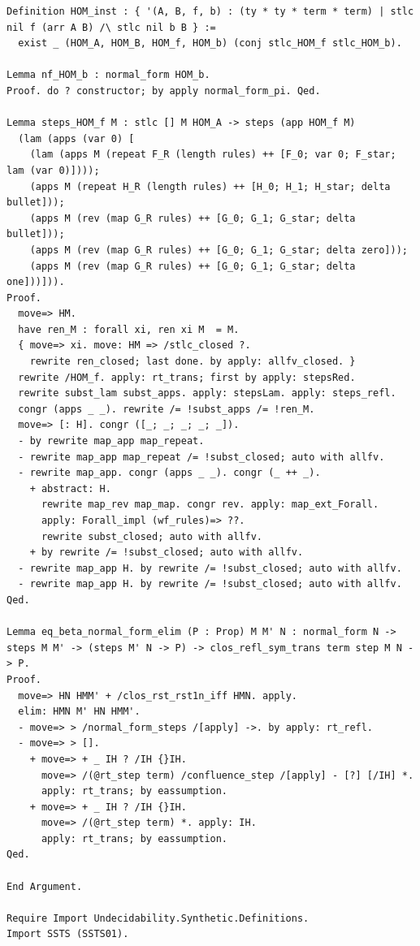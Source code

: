 \documentclass[10pt,a4paper]{amsart}
\begin{document}
\begin{lstlisting}
Definition HOM_inst : { '(A, B, f, b) : (ty * ty * term * term) | stlc nil f (arr A B) /\ stlc nil b B } :=
  exist _ (HOM_A, HOM_B, HOM_f, HOM_b) (conj stlc_HOM_f stlc_HOM_b).

Lemma nf_HOM_b : normal_form HOM_b.
Proof. do ? constructor; by apply normal_form_pi. Qed.

Lemma steps_HOM_f M : stlc [] M HOM_A -> steps (app HOM_f M) 
  (lam (apps (var 0) [
    (lam (apps M (repeat F_R (length rules) ++ [F_0; var 0; F_star; lam (var 0)])));
    (apps M (repeat H_R (length rules) ++ [H_0; H_1; H_star; delta bullet]));
    (apps M (rev (map G_R rules) ++ [G_0; G_1; G_star; delta bullet]));
    (apps M (rev (map G_R rules) ++ [G_0; G_1; G_star; delta zero]));
    (apps M (rev (map G_R rules) ++ [G_0; G_1; G_star; delta one]))])).
Proof.
  move=> HM.
  have ren_M : forall xi, ren xi M  = M.
  { move=> xi. move: HM => /stlc_closed ?.
    rewrite ren_closed; last done. by apply: allfv_closed. }
  rewrite /HOM_f. apply: rt_trans; first by apply: stepsRed.
  rewrite subst_lam subst_apps. apply: stepsLam. apply: steps_refl.
  congr (apps _ _). rewrite /= !subst_apps /= !ren_M.
  move=> [: H]. congr ([_; _; _; _; _]).
  - by rewrite map_app map_repeat.
  - rewrite map_app map_repeat /= !subst_closed; auto with allfv.
  - rewrite map_app. congr (apps _ _). congr (_ ++ _).
    + abstract: H.
      rewrite map_rev map_map. congr rev. apply: map_ext_Forall.
      apply: Forall_impl (wf_rules)=> ??.
      rewrite subst_closed; auto with allfv.
    + by rewrite /= !subst_closed; auto with allfv.
  - rewrite map_app H. by rewrite /= !subst_closed; auto with allfv.
  - rewrite map_app H. by rewrite /= !subst_closed; auto with allfv.
Qed.

Lemma eq_beta_normal_form_elim (P : Prop) M M' N : normal_form N -> steps M M' -> (steps M' N -> P) -> clos_refl_sym_trans term step M N -> P.
Proof.
  move=> HN HMM' + /clos_rst_rst1n_iff HMN. apply.
  elim: HMN M' HN HMM'.
  - move=> > /normal_form_steps /[apply] ->. by apply: rt_refl.
  - move=> > [].
    + move=> + _ IH ? /IH {}IH.
      move=> /(@rt_step term) /confluence_step /[apply] - [?] [/IH] *.
      apply: rt_trans; by eassumption.
    + move=> + _ IH ? /IH {}IH.
      move=> /(@rt_step term) *. apply: IH.
      apply: rt_trans; by eassumption.
Qed.

End Argument.

Require Import Undecidability.Synthetic.Definitions.
Import SSTS (SSTS01).


\end{lstlisting}
\end{document}
